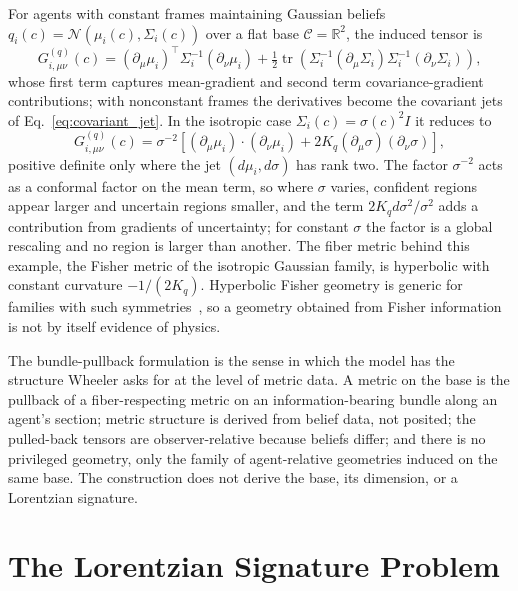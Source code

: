 For agents with constant frames maintaining Gaussian beliefs $q_i(c) = \mathcal{N}(\mu_i(c), \Sigma_i(c))$ over a flat base $\mathcal{C} = \mathbb{R}^2$, the induced tensor is
\begin{equation}
G^{(q)}_{i,\mu\nu}(c) = (\partial_\mu \mu_i)^\top \Sigma_i^{-1} (\partial_\nu \mu_i) + \tfrac{1}{2}\operatorname{tr}\left(\Sigma_i^{-1}(\partial_\mu \Sigma_i)\Sigma_i^{-1}(\partial_\nu \Sigma_i)\right),
\end{equation}
whose first term captures mean-gradient and second term covariance-gradient contributions; with nonconstant frames the derivatives become the covariant jets of Eq.~\eqref{eq:covariant_jet}. In the isotropic case $\Sigma_i(c) = \sigma(c)^2 I$ it reduces to
\begin{equation}
G^{(q)}_{i,\mu\nu}(c) = \sigma^{-2}\left[(\partial_\mu\mu_i)\cdot(\partial_\nu\mu_i) + 2K_q (\partial_\mu\sigma)(\partial_\nu\sigma)\right],
\end{equation}
positive definite only where the jet $(d\mu_i, d\sigma)$ has rank two. The factor $\sigma^{-2}$ acts as a conformal factor on the mean term, so where $\sigma$ varies, confident regions appear larger and uncertain regions smaller, and the term $2K_q d\sigma^2/\sigma^2$ adds a contribution from gradients of uncertainty; for constant $\sigma$ the factor is a global rescaling and no region is larger than another. The fiber metric behind this example, the Fisher metric of the isotropic Gaussian family, is hyperbolic with constant curvature $-1/(2K_q)$. Hyperbolic Fisher geometry is generic for families with such symmetries~\cite{ErdmengerGrosvenorJefferson2020}, so a geometry obtained from Fisher information is not by itself evidence of physics.

The bundle-pullback formulation is the sense in which the model has the structure Wheeler asks for at the level of metric data. A metric on the base is the pullback of a fiber-respecting metric on an information-bearing bundle along an agent's section; metric structure is derived from belief data, not posited; the pulled-back tensors are observer-relative because beliefs differ; and there is no privileged geometry, only the family of agent-relative geometries induced on the same base. The construction does not derive the base, its dimension, or a Lorentzian signature.

\section{The Lorentzian Signature Problem}\label{sec:signature_resolution}

